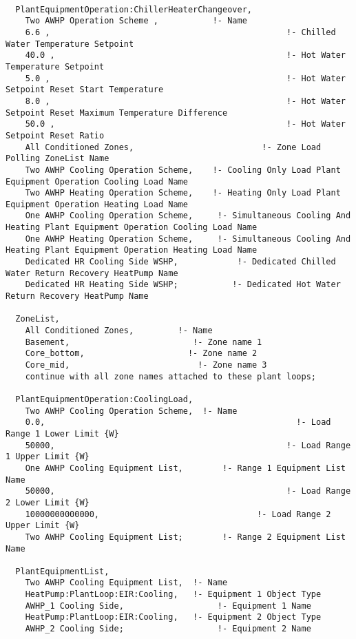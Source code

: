 \begin{lstlisting}

  PlantEquipmentOperation:ChillerHeaterChangeover,
    Two AWHP Operation Scheme ,           !- Name
    6.6 ,                                                !- Chilled Water Temperature Setpoint
    40.0 ,                                               !- Hot Water Temperature Setpoint
    5.0 ,                                                !- Hot Water Setpoint Reset Start Temperature
    8.0 ,                                                !- Hot Water Setpoint Reset Maximum Temperature Difference
    50.0 ,                                               !- Hot Water Setpoint Reset Ratio
    All Conditioned Zones,                          !- Zone Load Polling ZoneList Name
    Two AWHP Cooling Operation Scheme,    !- Cooling Only Load Plant Equipment Operation Cooling Load Name
    Two AWHP Heating Operation Scheme,    !- Heating Only Load Plant Equipment Operation Heating Load Name
    One AWHP Cooling Operation Scheme,     !- Simultaneous Cooling And Heating Plant Equipment Operation Cooling Load Name
    One AWHP Heating Operation Scheme,     !- Simultaneous Cooling And Heating Plant Equipment Operation Heating Load Name
    Dedicated HR Cooling Side WSHP,            !- Dedicated Chilled Water Return Recovery HeatPump Name
    Dedicated HR Heating Side WSHP;           !- Dedicated Hot Water Return Recovery HeatPump Name
   
  ZoneList,
    All Conditioned Zones,         !- Name
    Basement,                         !- Zone name 1
    Core_bottom,                     !- Zone name 2
    Core_mid,                          !- Zone name 3
    continue with all zone names attached to these plant loops;

  PlantEquipmentOperation:CoolingLoad,
    Two AWHP Cooling Operation Scheme,  !- Name
    0.0,                                                   !- Load Range 1 Lower Limit {W}
    50000,                                               !- Load Range 1 Upper Limit {W}
    One AWHP Cooling Equipment List,        !- Range 1 Equipment List Name
    50000,                                               !- Load Range 2 Lower Limit {W}
    10000000000000,                                !- Load Range 2 Upper Limit {W}
    Two AWHP Cooling Equipment List;        !- Range 2 Equipment List Name

  PlantEquipmentList,
    Two AWHP Cooling Equipment List,  !- Name
    HeatPump:PlantLoop:EIR:Cooling,   !- Equipment 1 Object Type
    AWHP_1 Cooling Side,                   !- Equipment 1 Name
    HeatPump:PlantLoop:EIR:Cooling,   !- Equipment 2 Object Type
    AWHP_2 Cooling Side;                   !- Equipment 2 Name  
\end{lstlisting}

